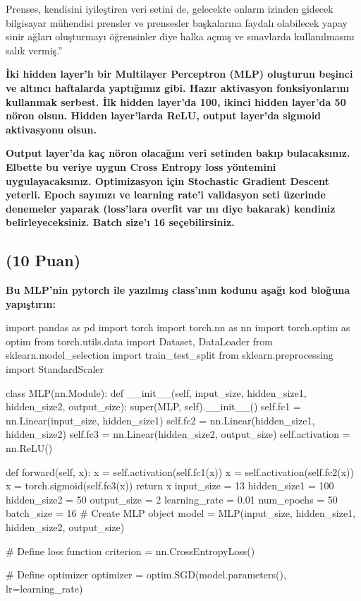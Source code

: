 \documentclass[11pt]{article}
\begin{document}
Prenses, kendisini iyileştiren veri setini de, gelecekte onların izinden gidecek bilgisayar mühendisi prensler ve prensesler başkalarına faydalı olabilecek yapay sinir ağları oluşturmayı öğrensinler diye halka açmış ve sınavlarda kullanılmasını salık vermiş.''

\textbf{İki hidden layer'lı bir Multilayer Perceptron (MLP) oluşturun beşinci ve altıncı haftalarda yaptığımız gibi. Hazır aktivasyon fonksiyonlarını kullanmak serbest. İlk hidden layer'da 100, ikinci hidden layer'da 50 nöron olsun. Hidden layer'larda ReLU, output layer'da sigmoid aktivasyonu olsun.}

\textbf{Output layer'da kaç nöron olacağını veri setinden bakıp bulacaksınız. Elbette bu veriye uygun Cross Entropy loss yöntemini uygulayacaksınız. Optimizasyon için Stochastic Gradient Descent yeterli. Epoch sayınızı ve learning rate'i validasyon seti üzerinde denemeler yaparak (loss'lara overfit var mı diye bakarak) kendiniz belirleyeceksiniz. Batch size'ı 16 seçebilirsiniz.}

\subsection{(10 Puan)} \textbf{Bu MLP'nin pytorch ile yazılmış class'ının kodunu aşağı kod bloğuna yapıştırın:}

\begin{python}
import pandas as pd
import torch
import torch.nn as nn
import torch.optim as optim
from torch.utils.data import Dataset, DataLoader
from sklearn.model_selection import train_test_split
from sklearn.preprocessing import StandardScaler


class MLP(nn.Module):
    def __init__(self, input_size, hidden_size1, hidden_size2, output_size):
        super(MLP, self).__init__()
        self.fc1 = nn.Linear(input_size, hidden_size1)
        self.fc2 = nn.Linear(hidden_size1, hidden_size2)
        self.fc3 = nn.Linear(hidden_size2, output_size)
        self.activation = nn.ReLU()

    def forward(self, x):
        x = self.activation(self.fc1(x))
        x = self.activation(self.fc2(x))
        x = torch.sigmoid(self.fc3(x))  
        return x
input_size = 13
hidden_size1 = 100
hidden_size2 = 50
output_size = 2
learning_rate = 0.01
num_epochs = 50
batch_size = 16
# Create MLP object
model = MLP(input_size, hidden_size1, hidden_size2, output_size)

# Define loss function
criterion = nn.CrossEntropyLoss()

# Define optimizer
optimizer = optim.SGD(model.parameters(), lr=learning_rate)  


  



\end{python}
\end{document}
